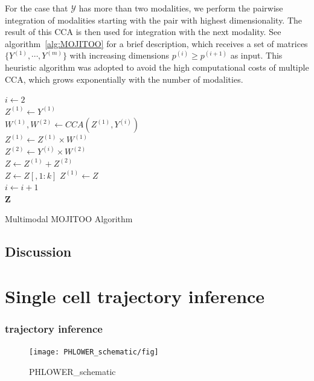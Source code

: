 For the case that $\mathcal{Y}$ has more than two modalities, we perform the pairwise integration of modalities starting with the pair with highest dimensionality. The result of this CCA is then used for integration with the next modality. See algorithm~\ref{alg:MOJITOO} for a brief description, which receives a set of matrices $\{Y^{(1)},\cdots, Y^{(m)}\}$ with increasing dimensions $p^{(i)}\geq p^{(i+1)}$ as input. This heuristic algorithm was adopted to avoid the high computational costs of multiple CCA, which grows exponentially with the number of modalities. 
\begin{algorithm}

	$i \gets 2$ \\
	$Z^{(1)} \gets Y^{(1)}$ \\
	{
		$W^{(1)}, W^{(2)} \gets CCA(Z^{(1)}, Y^{(i)})$ \\ 
		$Z^{(1)} \gets Z^{(1)}\times W^{(1)}$ \\ 
		$Z^{(2)} \gets Y^{(i)}\times W^{(2)}$  \\
		$Z \gets Z^{(1)} + Z^{(2)}$ \\ 
		$Z \gets Z[, 1:k]$ 
		$Z^{(1)} \gets Z$ \\
		$i \gets i+1$  \\
	}
	\Return $\mathbf{Z}$ 
	\caption{Multimodal MOJITOO Algorithm }
	\label{alg:MOJITOO}
\end{algorithm}

\subsection{Discussion}

\section{Single cell trajectory inference}
\label{methods:TI}

\subsubsection{trajectory inference}
\begin{figure}[!ht]
	\centering
	\texttt{[image: PHLOWER\_schematic/fig]}
	\vspace{0.1cm}
	\caption[PHLOWER\_schematic.]{PHLOWER\_schematic}
	\label{fig:PHLOWER_schematic}
\end{figure}

